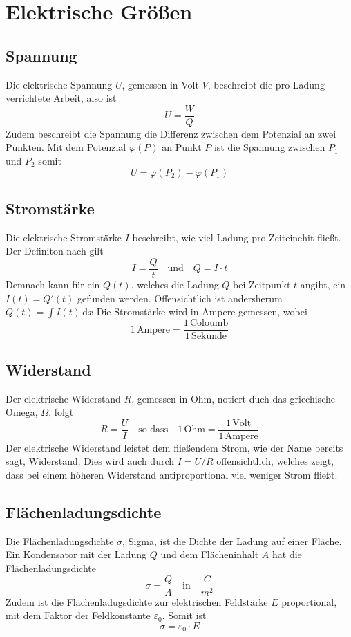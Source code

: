 \documentclass{article}
\begin{document}
 
\section{Elektrische Größen} 
 
\subsection{Spannung}
Die elektrische Spannung $U$, gemessen in Volt $V$, beschreibt die pro Ladung verrichtete Arbeit, also ist
\[
 U = \frac{W}{Q} 
\]
Zudem beschreibt die Spannung die Differenz zwischen dem Potenzial an zwei Punkten. Mit dem Potenzial $\varphi(P)$ an Punkt $P$ ist die Spannung zwischen $P_1$ und $P_2$ somit
\[
 U = \varphi(P_2) - \varphi(P_1) 
\]
 
\subsection{Stromstärke} 
Die elektrische Stromstärke $I$ beschreibt, wie viel Ladung pro Zeiteinehit fließt. Der Definiton nach gilt
\[
 I = \frac{Q}{t}
 \quad \text{und} \quad
 Q = I \cdot t 
\]
Demnach kann für ein $Q(t)$, welches die Ladung $Q$ bei Zeitpunkt $t$ angibt, ein $I(t)=Q'(t)$ gefunden werden. Offensichtlich ist andersherum $\displaystyle Q(t) = \int I(t) \,\mathrm{d}x$ 
Die Stromstärke wird in Ampere gemessen, wobei
\[
 1 \, \text{Ampere} = \frac{1 \, \text{Coloumb}}{1 \, \text{Sekunde}}
\]  
 
\subsection{Widerstand}
Der elektrische Widerstand $R$, gemessen in Ohm, notiert duch das griechische Omega, $\Omega$, folgt
\[
 R = \frac{U}{I}
 \quad \text{so dass} \quad
 1\,\text{Ohm} = \frac{1\,\text{Volt}}{1\,\text{Ampere}} 
\] 
Der elektrische Widerstand leistet dem fließendem Strom, wie der Name bereits sagt, Widerstand. Dies wird auch durch $I = U / R$ offensichtlich, welches zeigt, dass bei einem höheren Widerstand antiproportional viel weniger Strom fließt. 
 
\subsection{Flächenladungsdichte} 
Die Flächenladungsdichte $\sigma$, Sigma, ist die Dichte der Ladung auf einer Fläche. Ein Kondensator mit der Ladung $Q$ und dem Flächeninhalt $A$ hat die Flächenladungsdichte
\[
 \sigma = \frac{Q}{A}  
 \quad \text{in} \quad
 \frac{C}{m^2} 
\] 
Zudem ist die Flächenladugsdichte zur elektrischen Feldstärke $E$ proportional, mit dem Faktor der Feldkonstante $\varepsilon_0$. Somit ist
\[
 \sigma = \varepsilon_0 \cdot E 
\]
 
\end{document}
